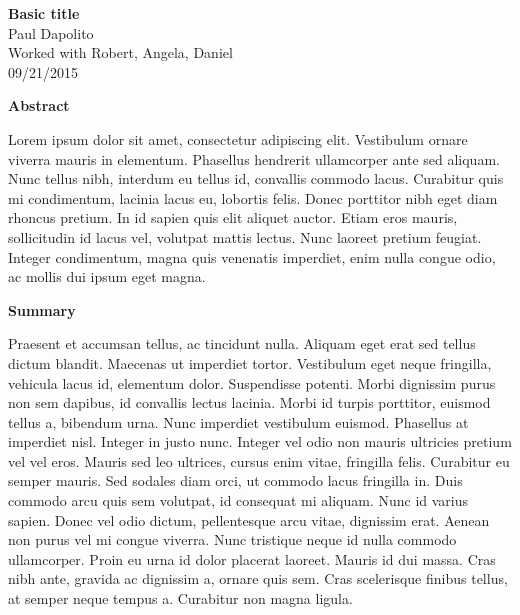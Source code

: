 \documentclass[letterpaper, boxed]{hmcpset}
\begin{document}
    \begin{center}
        \Large{\textbf{Basic title}} \\ 
        \large{Paul Dapolito} \\
        \large{Worked with Robert, Angela, Daniel} \\
        \large{09/21/2015}
    \end{center}

    \large \begin{flushleft}
    \textbf{Abstract}
    \end{flushleft}
    \normalsize
        Lorem ipsum dolor sit amet, consectetur adipiscing elit. Vestibulum ornare viverra mauris in elementum. Phasellus hendrerit ullamcorper ante sed aliquam. Nunc tellus nibh, interdum eu tellus id, convallis commodo lacus. Curabitur quis mi condimentum, lacinia lacus eu, lobortis felis. Donec porttitor nibh eget diam rhoncus pretium. In id sapien quis elit aliquet auctor. Etiam eros mauris, sollicitudin id lacus vel, volutpat mattis lectus. Nunc laoreet pretium feugiat. Integer condimentum, magna quis venenatis imperdiet, enim nulla congue odio, ac mollis dui ipsum eget magna.

    \large \begin{flushleft}
    \textbf{Summary}
    \end{flushleft}
    \normalsize
        Praesent et accumsan tellus, ac tincidunt nulla. Aliquam eget erat sed tellus dictum blandit. Maecenas ut imperdiet tortor. Vestibulum eget neque fringilla, vehicula lacus id, elementum dolor. Suspendisse potenti. Morbi dignissim purus non sem dapibus, id convallis lectus lacinia. Morbi id turpis porttitor, euismod tellus a, bibendum urna. Nunc imperdiet vestibulum euismod. Phasellus at imperdiet nisl. Integer in justo nunc. Integer vel odio non mauris ultricies pretium vel vel eros. Mauris sed leo ultrices, cursus enim vitae, fringilla felis. Curabitur eu semper mauris. Sed sodales diam orci, ut commodo lacus fringilla in. Duis commodo arcu quis sem volutpat, id consequat mi aliquam.
        Nunc id varius sapien. Donec vel odio dictum, pellentesque arcu vitae, dignissim erat. Aenean non purus vel mi congue viverra. Nunc tristique neque id nulla commodo ullamcorper. Proin eu urna id dolor placerat laoreet. Mauris id dui massa. Cras nibh ante, gravida ac dignissim a, ornare quis sem. Cras scelerisque finibus tellus, at semper neque tempus a. Curabitur non magna ligula.
\end{document}
